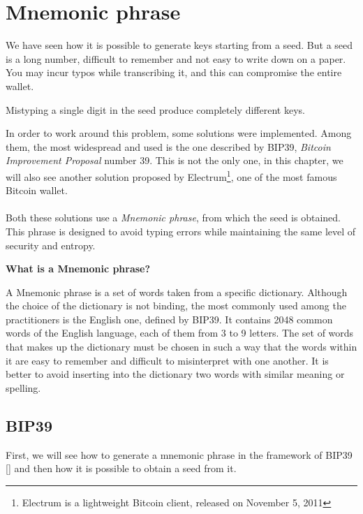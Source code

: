 
\chapter{Mnemonic phrase} %

\label{mnemonic} %


We have seen how it is possible to generate keys starting from a seed. But a seed is a long number, difficult to remember and not easy to write down on a paper. You may incur typos while transcribing it, and this can compromise the entire wallet.
\begin{remark}
	Mistyping a single digit in the seed produce completely different keys.
\end{remark}
In order to work around this problem, some solutions were implemented. Among them, the most widespread and used is the one described by BIP39, \textit{Bitcoin Improvement Proposal} number 39. This is not the only one, in this chapter, we will also see another solution proposed by Electrum\footnote{Electrum is a lightweight Bitcoin client, released on November 5, 2011}, one of the most famous Bitcoin wallet.
\\ \\
Both these solutions use a \textit{Mnemonic phrase}, from which the seed is obtained. This phrase is designed to avoid typing errors while maintaining the same level of security and entropy.
\begin{flushleft}
	\textbf{What is a Mnemonic phrase?}
\end{flushleft}
A Mnemonic phrase is a set of words taken from a specific dictionary. Although the choice of the dictionary is not binding, the most commonly used among the practitioners is the English one, defined by BIP39. It contains 2048 common words of the English language, each of them from 3 to 9 letters. The set of words that makes up the dictionary must be chosen in such a way that the words within it are easy to remember and difficult to misinterpret with one another. It is better to avoid inserting into the dictionary two words with similar meaning or spelling.

\section{BIP39}
First, we will see how to generate a mnemonic phrase in the framework of BIP39 [\cite{2}] and then how it is possible to obtain a seed from it.

